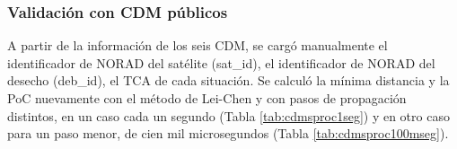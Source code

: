 \subsubsection*{Validaci\'on con CDM p\'ublicos}

A partir de la informaci\'on de los seis CDM, se carg\'o manualmente el identificador de NORAD del sat\'elite (sat\_id), el identificador de NORAD del desecho (deb\_id), el TCA de cada situaci\'on. Se calcul\'o la m\'inima distancia y la PoC nuevamente con el m\'etodo de Lei-Chen y con pasos de propagaci\'on distintos, en un caso cada un segundo (Tabla \ref{tab:cdmsproc1seg}) y en otro caso para un paso menor, de cien mil microsegundos (Tabla \ref{tab:cdmsproc100mseg}).
 
 \begin{table}[!h]
  \caption{ARxCODE a partir de los CDM \\ Propagaciones cada 1 segundo - (Radio de colisi\'on $r_{a}=0.01$ km) - M\'etodo de c\'alculo de PoC: Lei-Chen}
 \centering
 \label{tab:cdmsproc1seg}
 \end{table}
 
